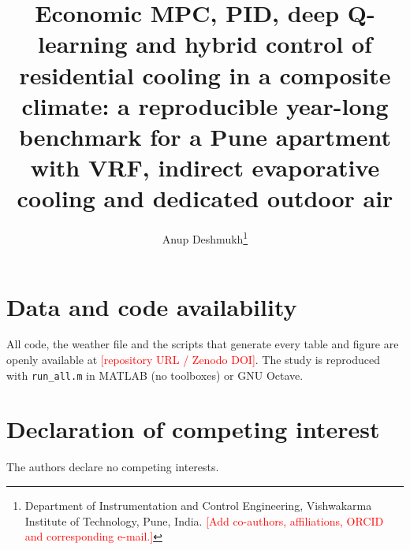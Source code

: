 \documentclass[11pt]{article}
\title{Economic MPC, PID, deep Q-learning and hybrid control of residential cooling in a
composite climate: a reproducible year-long benchmark for a Pune apartment with VRF,
indirect evaporative cooling and dedicated outdoor air}
\author{Anup Deshmukh\thanks{Department of Instrumentation and Control Engineering,
Vishwakarma Institute of Technology, Pune, India. \textcolor{red}{[Add co-authors,
affiliations, ORCID and corresponding e-mail.]}}}
\date{}
\begin{document}
\maketitle








\section*{Data and code availability}
All code, the weather file and the scripts that generate every table and figure are
openly available at \textcolor{red}{[repository URL / Zenodo DOI]}. The study is
reproduced with \texttt{run\_all.m} in MATLAB (no toolboxes) or GNU Octave.

\section*{Declaration of competing interest}
The authors declare no competing interests.


\end{document}
